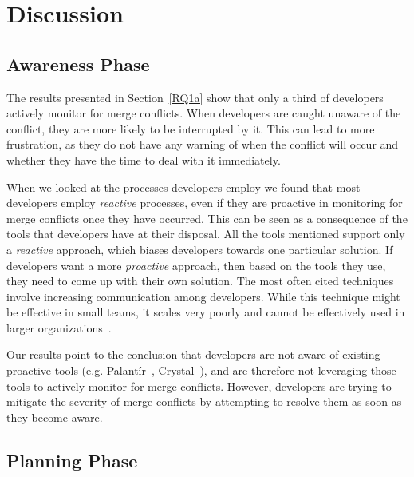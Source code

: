 
\section{Discussion}\label{discussion}

\subsection{Awareness Phase}

The results presented in Section~\ref{RQ1a} show that only a third of developers actively monitor for merge conflicts.
When developers are caught unaware of the conflict, they are more likely to be interrupted by it.
This can lead to more frustration, as they do not have any warning of when the conflict will occur and whether they have the time to deal with it immediately.

When we looked at the processes developers employ we found that most developers employ \emph{reactive} processes, even if they are proactive in monitoring for merge conflicts once they have occurred.
This can be seen as a consequence of the tools that developers have at their disposal.
All the tools mentioned support only a \emph{reactive} approach, which biases developers towards one particular solution.
If developers want a more \emph{proactive} approach, then based on the tools they use, they need to come up with their own solution.
The most often cited techniques involve increasing communication among developers.
While this technique might be effective in small teams, it scales very poorly and cannot be effectively used in larger organizations~\cite{brooks1974mythical}.

Our results point to the conclusion that developers are not aware of existing proactive tools (e.g. Palant\'{i}r~\cite{sarma_palantir:_2003}, Crystal~\cite{Brun2011}), and are therefore not leveraging those tools to actively monitor for merge conflicts.
However, developers are trying to mitigate the severity of merge conflicts by attempting to resolve them as soon as they become aware.

\subsection{Planning Phase}


